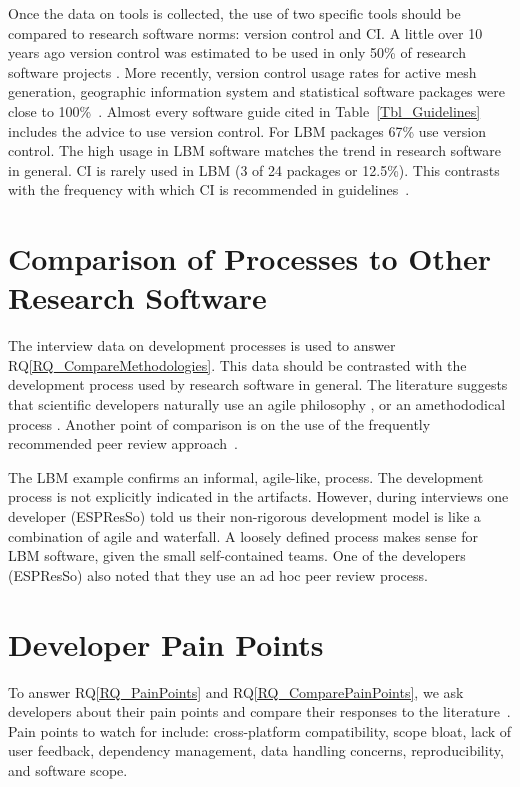 \documentclass[runningheads]{llncs}
\newcommand{\rqref}[1]{RQ\ref{#1}}
\begin{document}
Once the data on tools is collected, the use of two specific tools should be
compared to research software norms: version control and CI. A little over 10
years ago version control was estimated to be used in only 50\% of research
software projects \cite{Nguyen-HoanEtAl2010}. More recently, version control
usage rates for active mesh generation, geographic information system and
statistical software packages were close to 100\%~\cite{Smith2018}.  Almost
every software guide cited in Table~\ref{Tbl_Guidelines} includes the advice to
use version control. For LBM packages 67\% use version control. The high usage
in LBM software matches the trend in research software in general. CI is rarely
used in LBM (3 of 24 packages or 12.5\%). This contrasts with the frequency with
which CI is recommended in
guidelines~\cite{BrettEtAl2021,vanGompelEtAl2016,ThielEtAl2020}.

\section{Comparison of Processes to Other Research Software} \label{Sec_CompareMethodologies}

The interview data on development processes is used to answer
\rqref{RQ_CompareMethodologies}.  This data should be contrasted with the
development process used by research software in general. The literature
suggests that scientific developers naturally use an agile philosophy
\cite{CarverEtAl2007,Segal2005}, or an amethododical process \cite{Kelly2013}.
Another point of comparison is on the use of the frequently recommended peer
review approach~\cite{HerouxEtAl2008,OrvizEtAl2017,USGS2019}.

The LBM example confirms an informal, agile-like, process. The development
process is not explicitly indicated in the artifacts. However, during interviews
one developer (ESPResSo) told us their non-rigorous development model is like a
combination of agile and waterfall. A loosely defined process makes sense for
LBM software, given the small self-contained teams. One of the developers
(ESPResSo) also noted that they use an ad hoc peer review process.

\section{Developer Pain Points} \label{painpoints}

To answer \rqref{RQ_PainPoints} and \rqref{RQ_ComparePainPoints}, we ask
developers about their pain points and compare their responses to the
literature~\cite{WieseEtAl2019,PintoEtAl2018}. Pain points to watch for include:
cross-platform compatibility, scope bloat, lack of user feedback, dependency
management, data handling concerns, reproducibility, and software scope. 
\end{document}

